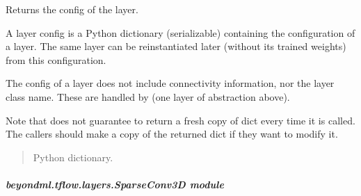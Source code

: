 \documentclass[letterpaper,10pt,english]{sphinxmanual}
\begin{document}
\begin{fulllineitems}
\begin{fulllineitems}
\end{fulllineitems}


\begin{fulllineitems}
\label{\detokenize{beyondml.tflow.layers:beyondml.tflow.layers.SparseConv2D.SparseConv2D.get_config}}
\pysigstartsignatures
{}
\pysigstopsignatures
\sphinxAtStartPar
Returns the config of the layer.

\sphinxAtStartPar
A layer config is a Python dictionary (serializable)
containing the configuration of a layer.
The same layer can be reinstantiated later
(without its trained weights) from this configuration.

\sphinxAtStartPar
The config of a layer does not include connectivity
information, nor the layer class name. These are handled
by  (one layer of abstraction above).

\sphinxAtStartPar
Note that  does not guarantee to return a fresh copy of
dict every time it is called. The callers should make a copy of the
returned dict if they want to modify it.
\begin{quote}\begin{description}
\sphinxAtStartPar
Python dictionary.

\end{description}\end{quote}

\end{fulllineitems}


\end{fulllineitems}



\subparagraph{beyondml.tflow.layers.SparseConv3D module}
\label{\detokenize{beyondml.tflow.layers:module-beyondml.tflow.layers.SparseConv3D}}\label{\detokenize{beyondml.tflow.layers:beyondml-tflow-layers-sparseconv3d-module}}
\end{document}
